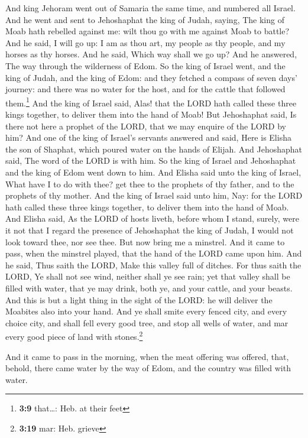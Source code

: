  And king Jehoram went out of Samaria the same time, and
numbered all Israel.  And he went and sent to Jehoshaphat
the king of Judah, saying, The king of Moab hath rebelled against me:
wilt thou go with me against Moab to battle? And he said, I will go up:
I am as thou art, my people as thy people, and my horses as thy horses.
 And he said, Which way shall we go up? And he answered,
The way through the wilderness of Edom.  So the king of
Israel went, and the king of Judah, and the king of Edom: and they
fetched a compass of seven days' journey: and there was no water for the
host, and for the cattle that followed them.\footnote{\textbf{3:9}
  that\ldots: Heb. at their feet}  And the king of Israel
said, Alas! that the LORD hath called these three kings together, to
deliver them into the hand of Moab!  But Jehoshaphat
said, Is there not here a prophet of the LORD, that we may enquire of
the LORD by him? And one of the king of Israel's servants answered and
said, Here is Elisha the son of Shaphat, which poured water on the hands
of Elijah.  And Jehoshaphat said, The word of the LORD is
with him. So the king of Israel and Jehoshaphat and the king of Edom
went down to him.  And Elisha said unto the king of
Israel, What have I to do with thee? get thee to the prophets of thy
father, and to the prophets of thy mother. And the king of Israel said
unto him, Nay: for the LORD hath called these three kings together, to
deliver them into the hand of Moab.  And Elisha said, As
the LORD of hosts liveth, before whom I stand, surely, were it not that
I regard the presence of Jehoshaphat the king of Judah, I would not look
toward thee, nor see thee.  But now bring me a minstrel.
And it came to pass, when the minstrel played, that the hand of the LORD
came upon him.  And he said, Thus saith the LORD, Make
this valley full of ditches.  For thus saith the LORD, Ye
shall not see wind, neither shall ye see rain; yet that valley shall be
filled with water, that ye may drink, both ye, and your cattle, and your
beasts.  And this is but a light thing in the sight of
the LORD: he will deliver the Moabites also into your hand.
 And ye shall smite every fenced city, and every choice
city, and shall fell every good tree, and stop all wells of water, and
mar every good piece of land with stones.\footnote{\textbf{3:19} mar:
  Heb. grieve}

 And it came to pass in the morning, when the meat
offering was offered, that, behold, there came water by the way of Edom,
and the country was filled with water.

